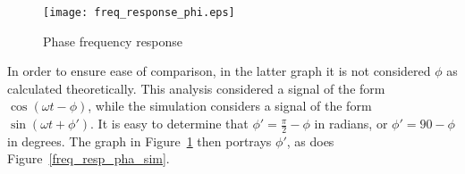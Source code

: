 \begin{figure}[H]
  \centering
  \texttt{[image: freq\_response\_phi.eps]}
  \caption{Phase frequency response}
  \label{freq_resp_pha}
\end{figure}

In order to ensure ease of comparison, in the latter graph it is not considered $\phi$ as calculated theoretically. This analysis considered a signal of the form $\cos(\omega t - \phi)$, while the simulation considers a signal of the form $\sin(\omega t + \phi')$. It is easy to determine that $\phi' = \frac{\pi}{2} - \phi$ in radians, or $\phi' = 90 - \phi$ in degrees. The graph in Figure~\ref{freq_resp_pha} then portrays $\phi'$, as does Figure~\ref{freq_resp_pha_sim}.

